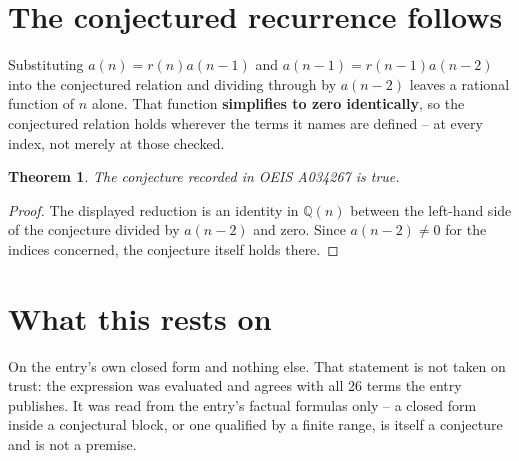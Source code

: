 \documentclass[11pt,a4paper]{article}
\theoremstyle{plain}
\newtheorem{theorem}{Theorem}
\theoremstyle{definition}
\begin{document}
\section{The conjectured recurrence follows}

Substituting $a(n)=r(n)a(n-1)$ and $a(n-1)=r(n-1)a(n-2)$ into the conjectured relation and
dividing through by $a(n-2)$ leaves a rational function of $n$ alone. That function
\textbf{simplifies to zero identically}, so the conjectured relation holds wherever the terms
it names are defined -- at every index, not merely at those checked.

\begin{theorem}
The conjecture recorded in OEIS A034267 is true.
\end{theorem}

\begin{proof}
The displayed reduction is an identity in $\mathbb{Q}(n)$ between the left-hand side of the
conjecture divided by $a(n-2)$ and zero. Since $a(n-2)\ne0$ for the indices concerned, the
conjecture itself holds there.
\end{proof}

\section{What this rests on}

On the entry's own closed form and nothing else. That statement is not taken on trust: the
expression was evaluated and agrees with all 26 terms the entry publishes. It was read
from the entry's factual formulas only -- a closed form inside a conjectural block, or one
qualified by a finite range, is itself a conjecture and is not a premise.
\end{document}
